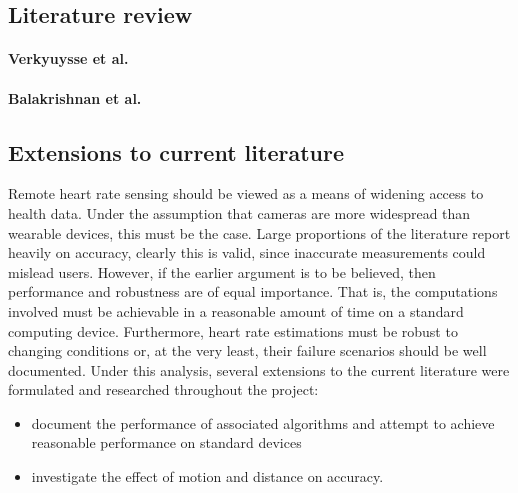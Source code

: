 \subsection{Literature review}
\label{ref:literature_review}
\paragraph{Verkyuysse et al. \cite{Verkruysse2008}}

\paragraph{Balakrishnan et al. \cite{Balakrishnan_2013_CVPR}}

\paragraph{}


\subsection{Extensions to current literature}
Remote heart rate sensing should be viewed as a means of widening access to health data. Under the assumption that cameras are more widespread than wearable devices, this must be the case.
Large proportions of the literature report heavily on accuracy, clearly this is valid, since inaccurate measurements could mislead users. However, if the earlier argument is to be believed, then 
performance and robustness are of equal importance. That is, the computations involved must be achievable in a reasonable amount of time on a standard computing device. 
Furthermore, heart rate estimations must be robust to changing conditions or, at the very least, their failure scenarios should be well documented. 
Under this analysis, several extensions to the current literature were formulated and researched throughout the project:
\begin{itemize}
    \item document the performance of associated algorithms and attempt to achieve reasonable performance on standard devices
    \item investigate the effect of motion and distance on accuracy.
\end{itemize}


